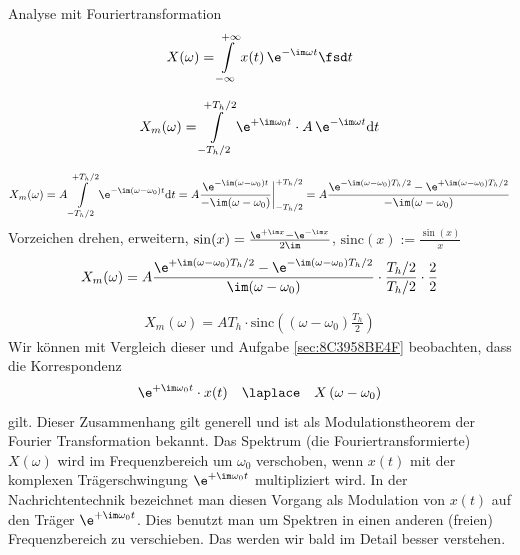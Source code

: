 \begin{Werkzeug}
Analyse mit Fouriertransformation
\begin{align}
X(\omega) = \int\limits_{-\infty}^{+\infty} x(t) \, \e^{-\im \omega t} \fsd t
\end{align}
\end{Werkzeug}
\begin{Ansatz}
\begin{align}
X_m(\omega) = \int\limits_{-T_h/2}^{+T_h/2} \e^{+\im \omega_0 t} \cdot A \, \e^{-\im \omega t} \mathrm{d}t
\end{align}
\end{Ansatz}
\begin{ExCalc}
\begin{align}
X_m(\omega) = A \int\limits_{-T_h/2}^{+T_h/2} \e^{-\im (\omega-\omega_0) t} \mathrm{d}t =
A \frac{\e^{-\im (\omega-\omega_0) t}}{-\im (\omega-\omega_0)}\bigg|_{-T_h/2}^{+T_h/2} =
A \frac{\e^{-\im (\omega-\omega_0) T_h/2} - \e^{+\im (\omega-\omega_0) T_h/2}}{-\im (\omega-\omega_0)}
\end{align}
Vorzeichen drehen, erweitern, $\sin(x) = \frac{\e^{+\im x}-\e^{-\im x}}{2\im}$, $\mathrm{sinc}(x):=\frac{\sin (x)}{x}$
\begin{align}
X_m(\omega) = A \frac{\e^{+\im (\omega-\omega_0) T_h/2} - \e^{-\im (\omega-\omega_0) T_h/2}}{\im (\omega-\omega_0)} \cdot \frac{T_h/2}{T_h/2} \cdot \frac{2}{2}
\end{align}
\end{ExCalc}
\begin{Loesung}
\begin{align}
X_m(\omega) = A T_h \cdot \mathrm{sinc}\left((\omega-\omega_0) \frac{T_h}{2}\right)
\end{align}
Wir können mit Vergleich dieser und  Aufgabe \ref{sec:8C3958BE4F} beobachten, dass
die Korrespondenz
\begin{align}
\e^{+\im \omega_0 t} \cdot x(t) \quad\laplace\quad X\left(\omega-\omega_0\right)
\end{align}
gilt.
%
Dieser Zusammenhang gilt generell und ist als Modulationstheorem der
Fourier Transformation bekannt.
%
Das Spektrum (die Fouriertransformierte) $X(\omega)$ wird im Frequenzbereich
um $\omega_0$ verschoben, wenn $x(t)$ mit der komplexen Trägerschwingung
$\e^{+\im \omega_0 t}$ multipliziert wird. In der Nachrichtentechnik bezeichnet man
diesen Vorgang als Modulation von $x(t)$ auf den Träger $\e^{+\im \omega_0 t}$.
Dies benutzt man um Spektren in einen anderen (freien) Frequenzbereich zu
verschieben. Das werden wir bald im Detail besser verstehen.
\end{Loesung}


